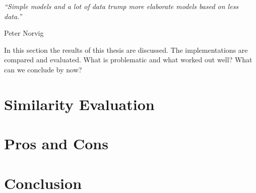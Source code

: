 \epigraph{\emph{
  ``Simple models and a lot of data trump more elaborate models based on less data.''
}}{ Peter Norvig }

In this section the results of this thesis are discussed. The implementations are compared and evaluated. What is problematic and what worked out well? What can we conclude by now?

\section{Similarity Evaluation}
\section{Pros and Cons}
\section{Conclusion}